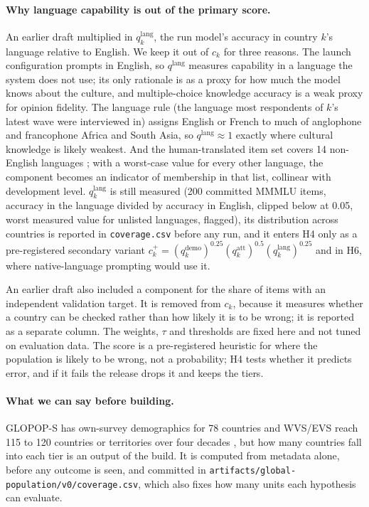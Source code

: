 \documentclass[10pt]{article}
\begin{document}
\paragraph{Why language capability is out of the primary score.} An earlier draft multiplied in $q^{\text{lang}}_k$, the run model's accuracy in country $k$'s language relative to English. We keep it out of $c_k$ for three reasons. The launch configuration prompts in English, so $q^{\text{lang}}$ measures capability in a language the system does not use; its only rationale is as a proxy for how much the model knows about the culture, and multiple-choice knowledge accuracy is a weak proxy for opinion fidelity. The language rule (the language most respondents of $k$'s latest wave were interviewed in) assigns English or French to much of anglophone and francophone Africa and South Asia, so $q^{\text{lang}} \approx 1$ exactly where cultural knowledge is likely weakest. And the human-translated item set covers 14 non-English languages \citep{mmmlu}; with a worst-case value for every other language, the component becomes an indicator of membership in that list, collinear with development level. $q^{\text{lang}}_k$ is still measured (200 committed MMMLU items, accuracy in the language divided by accuracy in English, clipped below at 0.05, worst measured value for unlisted languages, flagged), its distribution across countries is reported in \nolinkurl{coverage.csv} before any run, and it enters H4 only as a pre-registered secondary variant $c^{+}_k = (q^{\text{demo}}_k)^{0.25}(q^{\text{att}}_k)^{0.5}(q^{\text{lang}}_k)^{0.25}$ and in H6, where native-language prompting would use it.

An earlier draft also included a component for the share of items with an independent validation target. It is removed from $c_k$, because it measures whether a country can be checked rather than how likely it is to be wrong; it is reported as a separate column. The weights, $\tau$ and thresholds are fixed here and not tuned on evaluation data. The score is a pre-registered heuristic for where the population is likely to be wrong, not a probability; H4 tests whether it predicts error, and if it fails the release drops it and keeps the tiers.

\paragraph{What we can say before building.} GLOPOP-S has own-survey demographics for 78 countries \citep{ton2024glopop} and WVS/EVS reach 115 to 120 countries or territories over four decades \citep{haerpfer2022wvs}, but how many countries fall into each tier is an output of the build. It is computed from metadata alone, before any outcome is seen, and committed in \nolinkurl{artifacts/global-population/v0/coverage.csv}, which also fixes how many units each hypothesis can evaluate.
\end{document}
